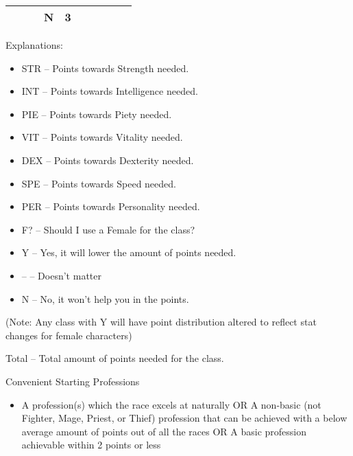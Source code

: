 \documentclass[12pt]{article}
\providecommand{\tightlist}{%
  \setlength{\itemsep}{0pt}\setlength{\parskip}{0pt}}
\begin{document}
\begin{longtable}[]{@{}|l|c|c|c|c|c|c|c|c|r|@{}}
\begin{minipage}[t]{0.06\columnwidth}
\strut\end{minipage} &
\begin{minipage}[t]{0.06\columnwidth}\raggedright\strut
\strut\end{minipage} &
\begin{minipage}[t]{0.06\columnwidth}\raggedright\strut
\strut\end{minipage} &
\begin{minipage}[t]{0.07\columnwidth}\raggedright\strut
N
\strut\end{minipage} &
\begin{minipage}[t]{0.08\columnwidth}\raggedright\strut
3
\strut\end{minipage}\tabularnewline
\bottomrule
\end{longtable}

Explanations:

\begin{itemize}
\tightlist
\item
  STR -- Points towards Strength needed.
\item
  INT -- Points towards Intelligence needed.
\item
  PIE -- Points towards Piety needed.
\item
  VIT -- Points towards Vitality needed.
\item
  DEX -- Points towards Dexterity needed.
\item
  SPE -- Points towards Speed needed.
\item
  PER -- Points towards Personality needed.
\item
  F? -- Should I use a Female for the class?
\item
  Y -- Yes, it will lower the amount of points needed.
\item
  -- -- Doesn't matter
\item
  N -- No, it won't help you in the points.
\end{itemize}

(Note: Any class with Y will have point distribution altered to reflect
stat changes for female characters)

Total -- Total amount of points needed for the class.

Convenient Starting Professions

\begin{itemize}
\tightlist
\item
  A profession(s) which the race excels at naturally OR A non-basic (not
  Fighter, Mage, Priest, or Thief) profession that can be achieved with
  a below average amount of points out of all the races OR A basic
  profession achievable within 2 points or less
\end{itemize}
\end{document}
